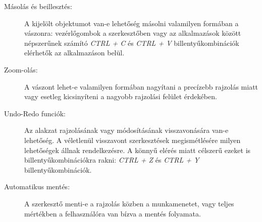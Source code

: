 \begin{description}
	\item[Másolás és beillesztés:] A kijelölt objektumot van-e lehetőség másolni valamilyen formában a vászonra: vezérlőgombok a szerkesztőben vagy az alkalmazások között népszerűnek számító \textit{CTRL + C} és \textit{CTRL + V} billentyűkombinációk elérhetők az alkalmazáson belül.
	\item[Zoom-olás:] A vászont lehet-e valamilyen formában nagyítani a precízebb rajzolás miatt vagy esetleg kicsinyíteni a nagyobb rajzolási felület érdekében. 
	\item[Undo-Redo funciók:] Az alakzat rajzolásának vagy módosításának visszavonására van-e lehetőség. A véletlenül visszavont szerkesztések megismétlésére milyen lehetőségek állnak rendelkezésre. A könnyű elérés miatt célszerű ezeket is billentyűkombinációkra rakni: \textit{CTRL + Z} és \textit{CTRL + Y} billentyűkombinációk.
	\item[Automatikus mentés:] A szerkesztő menti-e a rajzolás közben a munkamenetet, vagy teljes mértékben a felhasználóra van bízva a mentés folyamata.
\end{description}

